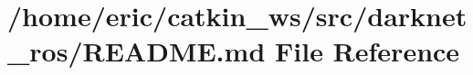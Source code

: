 \hypertarget{darknet__ros_2README_8md}{}\section{/home/eric/catkin\+\_\+ws/src/darknet\+\_\+ros/\+R\+E\+A\+D\+ME.md File Reference}
\label{darknet__ros_2README_8md}
